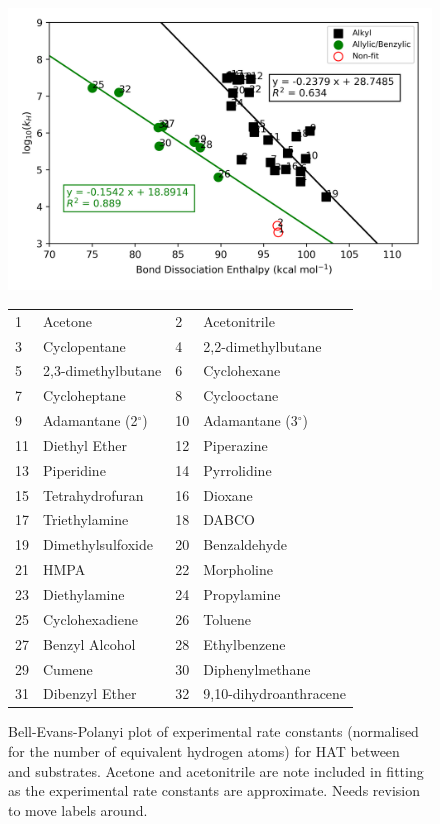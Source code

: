 \begin{figure}[H]
  \centering
  \includegraphics[width=\textwidth]{figures/bde-bep}
\begin{tabularx}{\textwidth}{| l X l X |}
  \hline
  1 & Acetone & 2 & Acetonitrile \\
  3 & Cyclopentane & 4 & 2,2-dimethylbutane \\
  5 & 2,3-dimethylbutane & 6 & Cyclohexane \\
  7 & Cycloheptane & 8 & Cyclooctane \\
  9 & Adamantane (2$^\circ$) & 10 & Adamantane (3$^\circ$) \\
  11 & Diethyl Ether & 12 & Piperazine \\
  13 & Piperidine & 14 & Pyrrolidine \\
  15 & Tetrahydrofuran & 16 & Dioxane \\
  17 & Triethylamine & 18 & DABCO \\
  19 & Dimethylsulfoxide & 20 & Benzaldehyde \\
  21 & HMPA & 22 & Morpholine \\
  23 & Diethylamine & 24 & Propylamine \\
  25 & Cyclohexadiene & 26 & Toluene \\
  27 & Benzyl Alcohol & 28 & Ethylbenzene \\
  29 & Cumene & 30 & Diphenylmethane \\
  31 & Dibenzyl Ether & 32 & 9,10-dihydroanthracene \\
  \hline
\end{tabularx}
  \caption{Bell-Evans-Polanyi plot of experimental rate constants (normalised for the number of equivalent hydrogen atoms) for HAT between \cumo~ and substrates. Acetone and acetonitrile are note included in fitting as the experimental rate constants are approximate. Needs revision to move labels around.}
\label{fig:bde-bep}
\end{figure}

